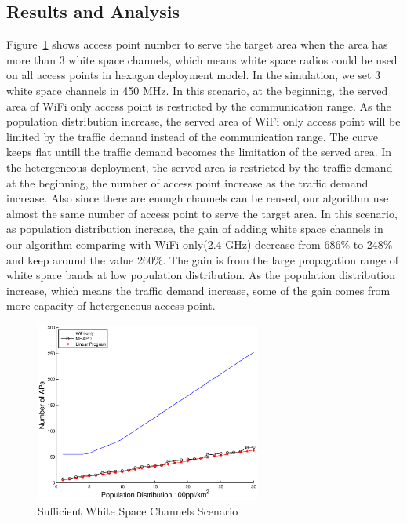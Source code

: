 \subsection{Results and Analysis} 
\label{subsec:result}

Figure~\ref{fig:enoughchannels} shows access point number to serve the target area when 
the area has more than 3 white space channels, which means white space radios could be used
on all access points in hexagon deployment model. In the simulation, we set 3 white space channels
in 450 MHz. In this scenario, at the beginning, the served area of WiFi only access point 
is restricted by the communication range. As the population distribution increase, 
the served area of WiFi only access point will be limited by the traffic demand instead 
of the communication range. The curve keeps flat untill the traffic demand becomes the limitation
of the served area. In the hetergeneous deployment, the served area is restricted by the traffic
demand at the beginning, the number of access point increase as the traffic demand increase. 
Also since there are enough channels can be reused, our algorithm use almost the same number of 
access point to serve the target area. In this scenario, as population distribution increase,
the gain of adding white space channels in our algorithm comparing with WiFi only(2.4 GHz) 
decrease from 686\% to 248\% and keep around the value 260\%. The gain is from the large 
propagation range of white space bands at low population distribution.
As the population distribution increase, which means the traffic demand increase, some of the gain
comes from more capacity of hetergeneous access point.


\begin{figure}
\centering
\includegraphics[width=74mm]{figures/enoughchannels}
\vspace{-0.1in}
\caption{Sufficient White Space Channels Scenario}                                                                 
\label{fig:enoughchannels}
\vspace{-0.1in}
\end{figure}

